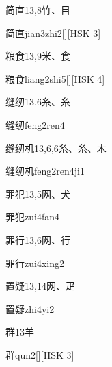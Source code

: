 \begin{entry}{简直}{13,8}{⽵、⽬}
  \begin{phonetics}{简直}{jian3zhi2}[][HSK 3]
  \end{phonetics}
\end{entry}

\begin{entry}{粮食}{13,9}{⽶、⾷}
  \begin{phonetics}{粮食}{liang2shi5}[][HSK 4]
  \end{phonetics}
\end{entry}

\begin{entry}{缝纫}{13,6}{⽷、⽷}
  \begin{phonetics}{缝纫}{feng2ren4}
  \end{phonetics}
\end{entry}

\begin{entry}{缝纫机}{13,6,6}{⽷、⽷、⽊}
  \begin{phonetics}{缝纫机}{feng2ren4ji1}
  \end{phonetics}
\end{entry}

\begin{entry}{罪犯}{13,5}{⽹、⽝}
  \begin{phonetics}{罪犯}{zui4fan4}
  \end{phonetics}
\end{entry}

\begin{entry}{罪行}{13,6}{⽹、⾏}
  \begin{phonetics}{罪行}{zui4xing2}
  \end{phonetics}
\end{entry}

\begin{entry}{置疑}{13,14}{⽹、⽦}
  \begin{phonetics}{置疑}{zhi4yi2}
  \end{phonetics}
\end{entry}

\begin{entry}{群}{13}{⽺}
  \begin{phonetics}{群}{qun2}[][HSK 3]
  \end{phonetics}
\end{entry}


